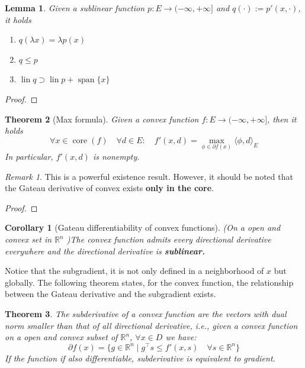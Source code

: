 \documentclass[a4paper,11pt,fleqn, draft]{book}
\newtheorem{theorem}{Theorem}[section]
\newtheorem{corollary}{Corollary}[theorem]
\newtheorem{lemma}[theorem]{Lemma}
\theoremstyle{definition}
\theoremstyle{remark}
\newtheorem*{remark}{Remark}
\DeclareMathOperator*{\spa}{span}
\DeclareMathOperator*{\lin}{lin}
\DeclareMathOperator*{\core}{core}
\begin{document}
\begin{lemma}
	Given a sublinear function $p: E \rightarrow (-\infty, + \infty]$ and $q(\cdot):= p'(x, \cdot)$,  it holds
	\begin{enumerate}
		\item $q(\lambda x ) = \lambda p(x)$
		\item $q \le p$ 
		\item $\lin q \supset \lin p + \spa\{x\}$ 
	\end{enumerate}
\end{lemma}
\begin{proof}
\end{proof}

\begin{theorem}[Max formula]
	Given a convex function $f: E \rightarrow (-\infty, +\infty]$, then it holds
	\begin{equation}
		\forall x \in \core(f) \quad \forall d \in E: \quad f'(x, d) = \max_{\phi \in \partial f(x) } \langle \phi, d \rangle_E
	\end{equation} 
	In particular, $f'(x, d)$ is nonempty. 
\end{theorem}
\begin{remark}
This is a powerful existence result. However, it should be noted that the Gateau derivative of convex exists \textbf{only in the core}.	
\end{remark}
\begin{proof}
\end{proof}

\begin{corollary}[Gateau differentiability of convex functions]
	(On a open and convex set in $\mathbb{R}^n$ )The convex function admits every directional derivative everywhere and the directional derivative is \textbf{sublinear. }
\end{corollary}

Notice that the subgradient, it is not only defined in a neighborhood of $x$ but globally. The following theorem states, for the convex function, the relationship between the Gateau derivative and the subgradient exists. 

\begin{theorem}
The subderivative of a convex function are the vectors with dual norm smaller than that of all directional derivative, i.e., given a convex function on a open and convex subset of $\mathbb{R}^n$, $\forall x \in D$ we have:
	\begin{equation}
		\partial f(x) = \{ g \in \mathbb{R}^n \mid g^\top s \leq f'(x,s)\quad \forall s \in \mathbb{R}^n\}
	\end{equation}
	If the function if also differentiable, subderivative is equivalent to gradient.
\end{theorem}
\end{document}
